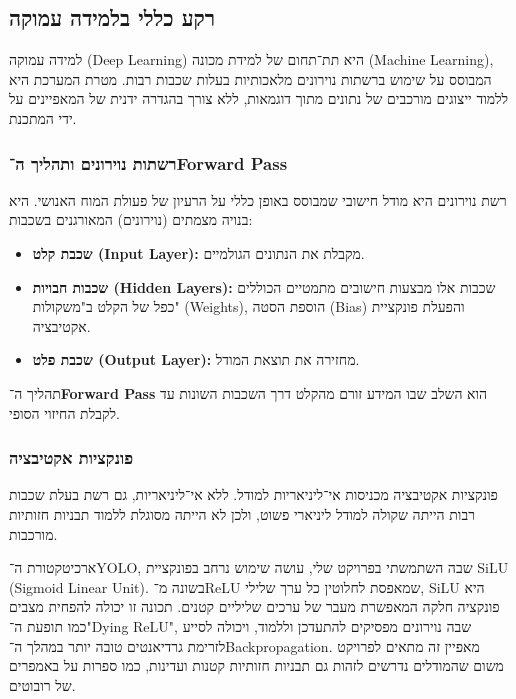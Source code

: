 \subsection{רקע כללי בלמידה עמוקה}

למידה עמוקה (\textenglish{Deep Learning}) היא תת־תחום של למידת מכונה
(\textenglish{Machine Learning}), המבוסס על שימוש ברשתות נוירונים
מלאכותיות בעלות שכבות רבות. מטרת המערכת היא ללמוד ייצוגים מורכבים של
נתונים מתוך דוגמאות, ללא צורך בהגדרה ידנית של המאפיינים על ידי המתכנת.

\subsubsection{רשתות נוירונים ותהליך ה־\textenglish{Forward Pass}}

רשת נוירונים היא מודל חישובי שמבוסס באופן כללי על הרעיון של פעולת המוח
האנושי. היא בנויה מצמתים (נוירונים) המאורגנים בשכבות:
\begin{itemize}
\item \textbf{שכבת קלט (\textenglish{Input Layer}):} מקבלת את הנתונים
הגולמיים.
\item \textbf{שכבות חבויות (\textenglish{Hidden Layers}):} שכבות אלו
מבצעות חישובים מתמטיים הכוללים כפל של הקלט ב"משקולות"
(\textenglish{Weights}), הוספת הסטה (\textenglish{Bias}) והפעלת
פונקציית אקטיבציה.
\item \textbf{שכבת פלט (\textenglish{Output Layer}):} מחזירה את תוצאת
המודל.
\end{itemize} תהליך ה־\textbf{\textenglish{Forward Pass}} הוא השלב שבו
המידע זורם מהקלט דרך השכבות השונות עד לקבלת החיזוי הסופי.

\subsubsection{פונקציות אקטיבציה}

פונקציות אקטיבציה מכניסות אי־ליניאריות למודל. ללא אי־ליניאריות, גם רשת
בעלת שכבות רבות הייתה שקולה למודל ליניארי פשוט, ולכן לא הייתה מסוגלת
ללמוד תבניות חזותיות מורכבות.

ארכיטקטורת ה־YOLO, שבה השתמשתי בפרויקט שלי, עושה שימוש נרחב בפונקציית
\linebreak \textenglish{SiLU (Sigmoid Linear Unit)}. בשונה
מ־\textenglish{ReLU} שמאפסת לחלוטין כל ערך שלילי, \textenglish{SiLU}
היא פונקציה חלקה המאפשרת מעבר של ערכים שליליים קטנים. תכונה זו יכולה
להפחית מצבים כמו תופעת ה־"\textenglish{Dying ReLU}", שבה נוירונים
מפסיקים להתעדכן וללמוד, ויכולה לסייע לזרימת גרדיאנטים טובה יותר במהלך
ה־\textenglish{Backpropagation}. מאפיין זה מתאים לפרויקט משום שהמודלים
נדרשים לזהות גם תבניות חזותיות קטנות ועדינות, כמו ספרות על באמפרים של
רובוטים.

